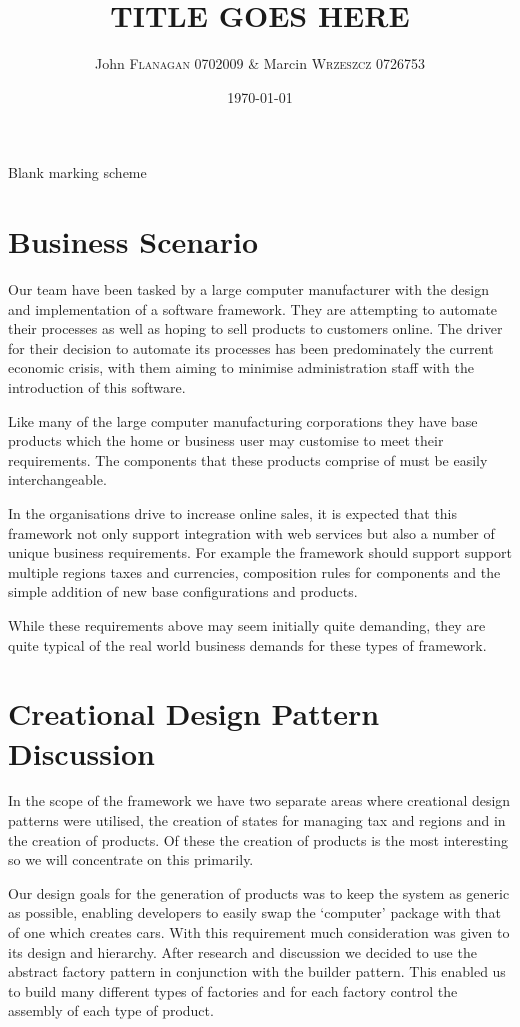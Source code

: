 \documentclass[pdftex,11pt,a4paper]{article}
\author{John \textsc{Flanagan} 0702009 \& Marcin \textsc{Wrzeszcz} 0726753 }
\title{TITLE GOES HERE}
\date{\today}
\begin{document}
\begin{center}
	Blank marking scheme
\end{center}

\pagebreak

\tableofcontents
\pagebreak

\section{Business Scenario}
Our team have been tasked by a large computer manufacturer with the design and implementation of a software framework. They are attempting to automate their processes as well as hoping to sell products to customers online. The driver for their decision to automate  its processes has been predominately the current economic crisis, with them aiming to minimise administration staff with the introduction of this software. 

Like many of the large computer manufacturing corporations they have base products which the home or business user may customise to meet their requirements. The components that these products comprise of must be easily interchangeable. 

In the organisations drive to increase online sales, it is expected that this framework not only support integration with web services but also a number of unique business requirements. For example the framework should support support multiple regions taxes and currencies, composition rules for components and the simple addition of new base configurations and products.

While these requirements above may seem initially quite demanding, they are quite typical of the real world business demands for these types of framework.

\pagebreak

\section{Creational Design Pattern Discussion}
In the scope of the framework we have two separate areas where creational design patterns were utilised, the creation of states for managing tax and regions and in the creation of products. Of these the creation of products is the most interesting so we will concentrate on this primarily.

Our design goals for the generation of products was to keep the system as generic as possible, enabling developers to easily swap the ‘computer’ package with that of one which creates cars. With this requirement much consideration was given to its design and hierarchy. After research and discussion we decided to use the abstract factory pattern in conjunction with the builder pattern. This enabled us to build many different types of factories and for each factory control the assembly of each type of product.
\end{document}
